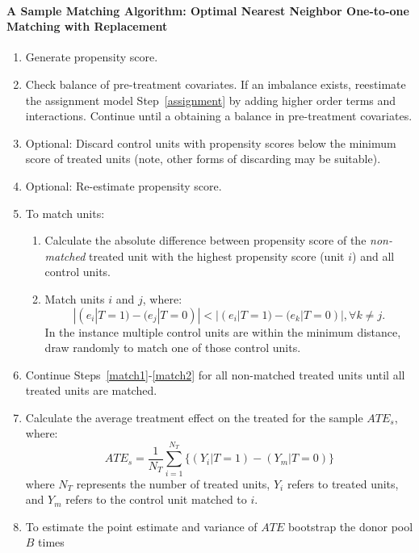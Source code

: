\documentclass[11pt,titlepage]{article}
\begin{document}
\paragraph{A Sample Matching Algorithm: Optimal Nearest Neighbor One-to-one
Matching with Replacement}
\begin{enumerate}
\item Generate propensity score. \label{assignment}
\item Check balance of pre-treatment covariates.  If an imbalance
  exists, reestimate the assignment model Step~\ref{assignment} by adding
  higher order terms and interactions.  Continue until a obtaining a
  balance in pre-treatment covariates.  
\item Optional: Discard control units with propensity scores below the minimum
  score of treated units (note, other forms of discarding may be suitable).
\item Optional: Re-estimate propensity score.
\item To match units: \label{match}
  \begin{enumerate}
  \item Calculate the absolute difference between propensity
    score of the \emph{non-matched} treated unit with the highest propensity
    score (unit $i$) and all control units. \label{match1}
  \item Match units $i$ and $j$, where:
    \begin{equation}
      | (e_i | T=1)-(e_j | T=0) | < | (e_i | T=1)-(e_k | T=0) |,  \forall k \ne j.  
    \end{equation}
    In the instance multiple control units are
    within the minimum distance, draw randomly to match one of those
    control units. \label{match2}
  \end{enumerate}
\item Continue Steps~\ref{match1}-\ref{match2} for all non-matched
  treated units until all treated units
  are matched. \label{match3}
\item Calculate the average treatment effect on the treated for the
  sample $ATE_s$, where:
  \begin{equation}
    ATE_s=\frac{1}{N_T} \sum_{i=1}^{N_T} \big\{ (Y_i|T=1) - (Y_m|T=0)
    \big \}
  \end{equation}
where $N_T$ represents the number of treated units, $Y_i$ refers to
treated units, and $Y_m$ refers to the control unit matched to $i$. 
\item To estimate the point estimate and variance of $ATE$ bootstrap the donor pool $B$ times

\end{enumerate}
\end{document}
